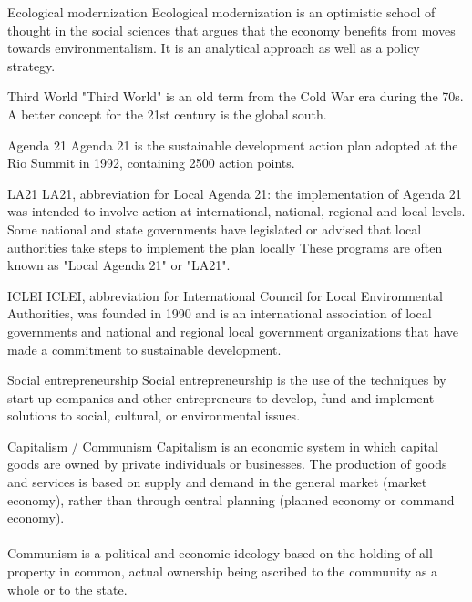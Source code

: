 \begin{sortEnvironment}{Ecological modernization}
Ecological modernization is an optimistic school of thought in the social sciences that argues that the economy benefits from moves towards environmentalism. It is an analytical approach as well as a policy strategy. 
\end{sortEnvironment}

\begin{sortEnvironment}{Third World}
"Third World" is an old term from the Cold War era during the 70s. A better concept for the 21st century is the global south.
\end{sortEnvironment}

\begin{sortEnvironment}{Agenda 21}
Agenda 21 is the sustainable development action plan adopted at the Rio Summit in 1992, containing 2500 action points.
\end{sortEnvironment}

\begin{sortEnvironment}{LA21}
LA21, abbreviation for Local Agenda 21: the implementation of Agenda 21 was intended to involve action at international, national, regional and local levels. Some national and state governments have legislated or advised that local authorities take steps to implement the plan locally These programs are often known as "Local Agenda 21" or "LA21".
\end{sortEnvironment}

\begin{sortEnvironment}{ICLEI}
ICLEI, abbreviation for International Council for Local Environmental Authorities, was founded in 1990 and is an international association of local governments and national and regional local government organizations that have made a commitment to sustainable development.
\end{sortEnvironment}

\begin{sortEnvironment}{Social entrepreneurship}
Social entrepreneurship is the use of the techniques by start-up companies and other entrepreneurs to develop, fund and implement solutions to social, cultural, or environmental issues.
\end{sortEnvironment}

\begin{sortEnvironment}{Capitalism / Communism}
Capitalism is an economic system in which capital goods are owned by private individuals or businesses. The production of goods and services is based on supply and demand in the general market (market economy), rather than through central planning (planned economy or command economy). \\
\\
Communism is a political and economic ideology based on the holding of all property in common, actual ownership being ascribed to the community as a whole or to the state.

\end{sortEnvironment}

